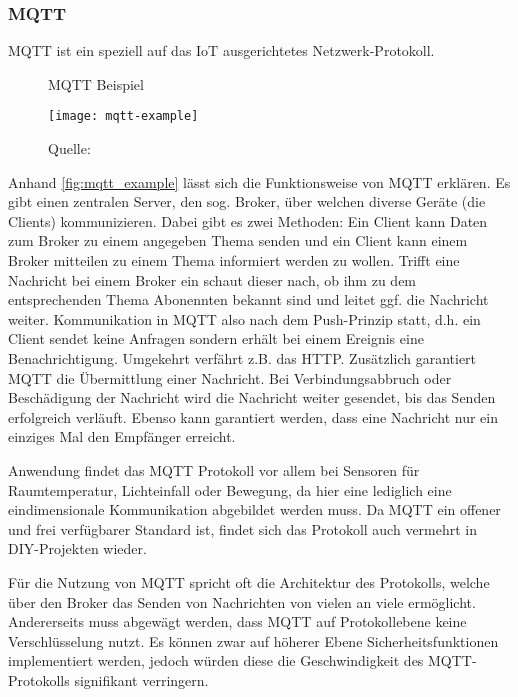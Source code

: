 \subsubsection{MQTT}

\ac{MQTT} ist ein speziell auf das \ac{IoT} ausgerichtetes Netzwerk-Protokoll.

\begin{figure}[ht]
	\centering
	\caption{MQTT Beispiel}
	\texttt{[image: mqtt-example]}
	\caption*{\footnotesize{Quelle: }}
	\label{fig:mqtt_example}
\end{figure}

Anhand \autoref{fig:mqtt_example} lässt sich die Funktionsweise von \ac{MQTT} erklären.
Es gibt einen zentralen Server, den sog. Broker, über welchen diverse Geräte (die Clients) kommunizieren.
Dabei gibt es zwei Methoden:
Ein Client kann Daten zum Broker zu einem angegeben Thema senden und ein Client kann einem Broker mitteilen zu einem Thema informiert werden zu wollen.
Trifft eine Nachricht bei einem Broker ein schaut dieser nach, ob ihm zu dem entsprechenden Thema Abonennten bekannt sind und leitet ggf. die Nachricht weiter.
Kommunikation in \ac{MQTT} also nach dem Push-Prinzip statt, d.h. ein Client sendet keine Anfragen sondern erhält bei einem Ereignis eine Benachrichtigung.
Umgekehrt verfährt z.B. das \ac{HTTP}.
Zusätzlich garantiert \ac{MQTT} die Übermittlung einer Nachricht.
Bei Verbindungsabbruch oder Beschädigung der Nachricht wird die Nachricht weiter gesendet, bis das Senden erfolgreich verläuft.
Ebenso kann garantiert werden, dass eine Nachricht nur ein einziges Mal den Empfänger erreicht.

Anwendung findet das \ac{MQTT} Protokoll vor allem bei Sensoren für Raumtemperatur, Lichteinfall oder Bewegung, da hier eine lediglich eine eindimensionale Kommunikation abgebildet werden muss.
Da \ac{MQTT} ein offener und frei verfügbarer Standard ist, findet sich das Protokoll auch vermehrt in \ac{DIY}-Projekten wieder.

Für die Nutzung von \ac{MQTT} spricht oft die Architektur des Protokolls, welche über den Broker das Senden von Nachrichten von vielen an viele ermöglicht.
Andererseits muss abgewägt werden, dass \ac{MQTT} auf Protokollebene keine Verschlüsselung nutzt.
Es können zwar auf höherer Ebene Sicherheitsfunktionen implementiert werden, jedoch würden diese die Geschwindigkeit des \ac{MQTT}-Protokolls signifikant verringern.

